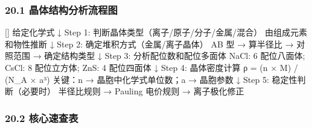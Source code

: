 \documentclass[a4paper,11pt]{ctexart}
\newenvironment{Shaded}{}{}
\newenvironment{Highlighting}{}{}
\newcommand{\NormalTok}[1]{#1}
\newcommand{\箭}{\ensuremath{\rightarrow}}
\newcommand{\左箭}{\ensuremath{\leftarrow}}
\newcommand{\上箭}{\ensuremath{\uparrow}}
\newcommand{\下箭}{\ensuremath{\downarrow}}
\newcommand{\衡}{\ensuremath{\rightleftharpoons}}
\newcommand{\双箭}{\ensuremath{\leftrightarrow}}
\newcommand{\约等于}{\ensuremath{\approx}}
\newcommand{\小于等于}{\ensuremath{\leq}}
\newcommand{\大于等于}{\ensuremath{\geq}}
\newcommand{\不等于}{\ensuremath{\neq}}
\newcommand{\西格马}{\ensuremath{\sigma}}
\newcommand{\派}{\ensuremath{\pi}}
\begin{document}
\subsubsection{20.1 晶体结构分析流程图}\label{ux6676ux4f53ux7ed3ux6784ux5206ux6790ux6d41ux7a0bux56fe}

\begin{Shaded}
\begin{Highlighting}[]
\NormalTok{给定化学式}
\NormalTok{   ↓}
\NormalTok{Step 1: 判断晶体类型（离子/原子/分子/金属/混合）}
\NormalTok{   由组成元素和物性推断}
\NormalTok{   ↓}
\NormalTok{Step 2: 确定堆积方式（金属/离子晶体）}
\NormalTok{   AB 型 → 算半径比 → 对照范围 → 确定结构类型}
\NormalTok{   ↓}
\NormalTok{Step 3: 分析配位数和配位多面体}
\NormalTok{   NaCl: 6 配位八面体; CsCl: 8 配位立方体; ZnS: 4 配位四面体}
\NormalTok{   ↓}
\NormalTok{Step 4: 晶体密度计算}
\NormalTok{   ρ = (n × M) / (N\_A × a³)}
\NormalTok{   关键：n → 晶胞中化学式单位数；a → 晶胞参数}
\NormalTok{   ↓}
\NormalTok{Step 5: 稳定性判断（必要时）}
\NormalTok{   半径比规则 → Pauling 电价规则 → 离子极化修正}
\end{Highlighting}
\end{Shaded}

\subsubsection{20.2 核心速查表}\label{ux6838ux5fc3ux901fux67e5ux8868}
\end{document}
